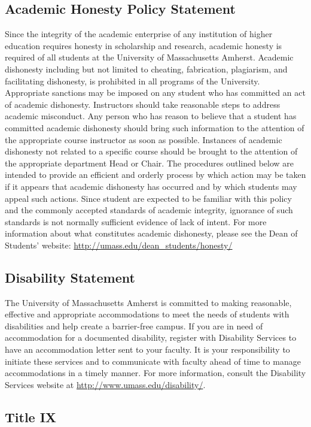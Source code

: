\documentclass[11pt,twoside]{article}
\numberwithin{equation}{section}
\newcommand{\?}{\stackrel{?}{=}}
\begin{document}
\subsection{Academic Honesty Policy Statement}
Since the integrity of the academic enterprise of any institution of higher education requires
honesty in scholarship and research, academic honesty is required of all students at the
University of Massachusetts Amherst. Academic dishonesty including but not limited to
cheating, fabrication, plagiarism, and facilitating dishonesty, is prohibited in all programs of
the University. Appropriate sanctions may be imposed on any student who has committed
an act of academic dishonesty. Instructors should take reasonable steps to address academic
misconduct. Any person who has reason to believe that a student has committed academic
dishonesty should bring such information to the attention of the appropriate course
instructor as soon as possible. Instances of academic dishonesty not related to a specific
course should be brought to the attention of the appropriate department Head or Chair. The
procedures outlined below are intended to provide an efficient and orderly process by which
action may be taken if it appears that academic dishonesty has occurred and by which
students may appeal such actions. Since student are expected to be familiar with this policy
and the commonly accepted standards of academic integrity, ignorance of such standards is
not normally sufficient evidence of lack of intent.
For more information about what constitutes academic dishonesty, please see the Dean of
Students' website: \url{http://umass.edu/dean_students/honesty/}

\subsection{Disability Statement}
The University of Massachusetts Amherst is committed to making reasonable, effective and
appropriate accommodations to meet the needs of students with disabilities and help create a
barrier-free campus. If you are in need of accommodation for a documented disability,
register with Disability Services to have an accommodation letter sent to your faculty. It is
your responsibility to initiate these services and to communicate with faculty ahead of time
to manage accommodations in a timely manner. For more information, consult the
Disability Services website at \url{http://www.umass.edu/disability/}.


\subsection{Title IX}
\end{document}
